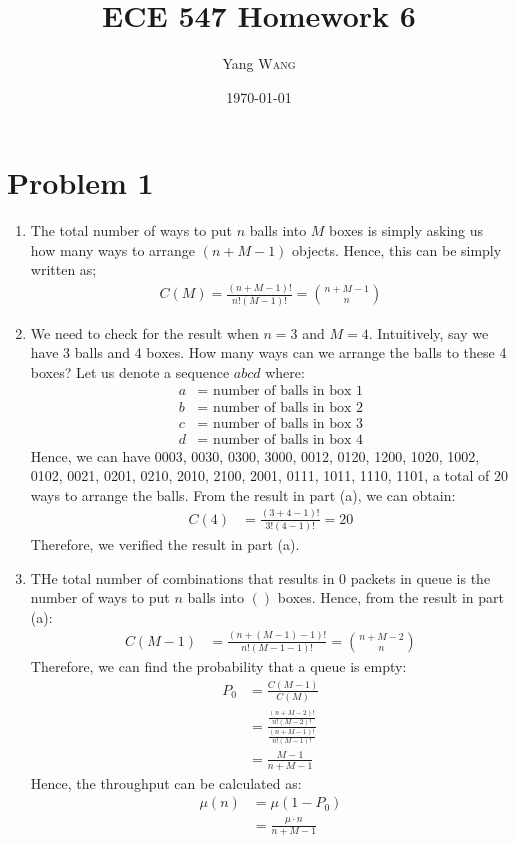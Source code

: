 \documentclass{article}
\title{ECE 547 Homework 6} %
\author{Yang \textsc{Wang}}  %
\date{\today} %
\begin{document}
\maketitle %


\section*{Problem 1}
	\begin{enumerate}
		\item The total number of ways to put $n$ balls into $M$ boxes is simply
			asking us how many ways to arrange $(n + M - 1)$ objects. Hence, this can
			be simply written as;
			\begin{align*}
				C(M) = \frac{(n+M-1)!}{n!(M-1)!} = \binom{n+M-1}{n}
			\end{align*}
		\item We need to check for the result when $n = 3$ and $M = 4$. Intuitively,
			say we have 3 balls and 4 boxes. How many ways can we arrange the balls
			to these 4 boxes? Let us denote a sequence $abcd$ where:
			\begin{align*}
				a &= \text{ number of balls in box 1} \\
				b &= \text{ number of balls in box 2} \\
				c &= \text{ number of balls in box 3} \\
				d &= \text{ number of balls in box 4}
			\end{align*}
			Hence, we can have 0003, 0030, 0300, 3000, 0012, 0120, 1200, 1020, 1002,
			0102, 0021, 0201, 0210, 2010, 2100, 2001, 0111, 1011, 1110, 1101, a total
			of 20 ways to arrange the balls. From the result in part (a), we can
			obtain:
			\begin{align*}
				C(4) &= \frac{(3+4-1)!}{3!(4-1)!} = 20
			\end{align*}
			Therefore, we verified the result in part (a).
		\item THe total number of combinations that results in 0 packets in queue
			is the number of ways to put $n$ balls into $()$ boxes. Hence, from the
			result in part (a):
			\begin{align*}
				C(M-1) &= \frac{(n+(M-1)-1)!}{n!(M-1-1)!} = \binom{n+M-2}{n}
			\end{align*}
			Therefore, we can find the probability that a queue is empty:
			\begin{align*}
				P_{0} &= \frac{C(M-1)}{C(M)} \\
					&= \frac{\frac{(n+M-2)!}{n!(M-2)!}}{\frac{(n+M-1)!}{n!(M-1)!}} \\
					&= \frac{M-1}{n+M-1}
			\end{align*}
			Hence, the throughput can be calculated as:
			\begin{align*}
				\mu(n) &= \mu (1-P_{0}) \\
				&= \frac{\mu \cdot n}{n+M-1}
			\end{align*}
	\end{enumerate}
\end{document}
